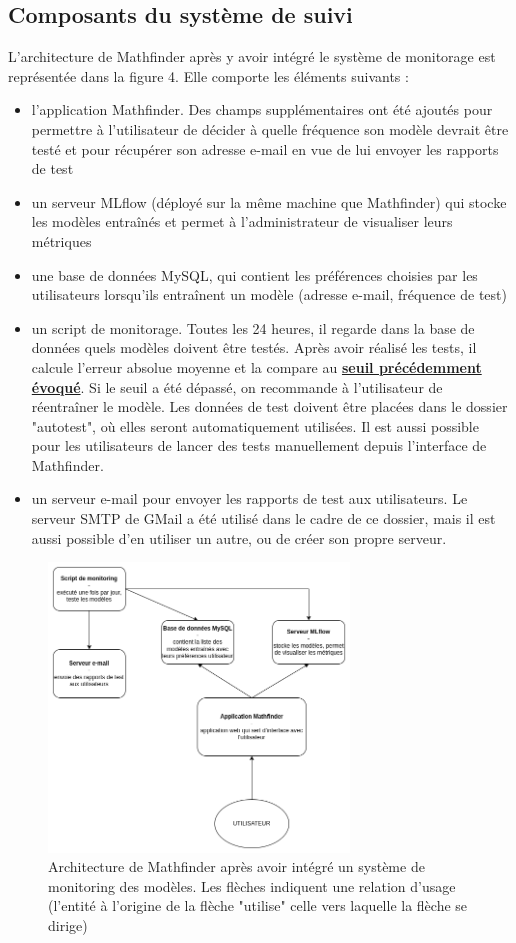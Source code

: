 \documentclass[french]{article}
\begin{document}
    \subsection{Composants du système de suivi}
    L'architecture de Mathfinder après y avoir intégré le système de monitorage est représentée dans la figure 4. Elle comporte les éléments suivants :
    \begin{itemize}
        \item l'application Mathfinder. Des champs supplémentaires ont été ajoutés pour permettre à l'utilisateur de décider à quelle fréquence son modèle devrait être testé et pour récupérer son adresse e-mail en vue de lui envoyer les rapports de test
        \item un serveur MLflow (déployé sur la même machine que Mathfinder) qui stocke les modèles entraînés et permet à l'administrateur de visualiser leurs métriques
        \item une base de données MySQL, qui contient les préférences choisies par les utilisateurs lorsqu'ils entraînent un modèle (adresse e-mail, fréquence de test)
        \item un script de monitorage. Toutes les 24 heures, il regarde dans la base de données quels modèles doivent être testés. Après avoir réalisé les tests, il calcule l'erreur absolue moyenne et la compare au \textbf{\hyperref[sec:metrics]{seuil précédemment évoqué}}. Si le seuil a été dépassé, on recommande à l'utilisateur de réentraîner le modèle. Les données de test doivent être placées dans le dossier "autotest", où elles seront automatiquement utilisées. Il est aussi possible pour les utilisateurs de lancer des tests manuellement depuis l'interface de Mathfinder.
        \item un serveur e-mail pour envoyer les rapports de test aux utilisateurs. Le serveur SMTP de GMail a été utilisé dans le cadre de ce dossier, mais il est aussi possible d'en utiliser un autre, ou de créer son propre serveur.
    \end{itemize}
    \begin{figure}[h!]
        \includegraphics[width=8cm]{monitoring_E5}
        \centering
        \caption{Architecture de Mathfinder après avoir intégré un système de monitoring des modèles. Les flèches indiquent une relation d'usage (l'entité à l'origine de la flèche "utilise" celle vers laquelle la flèche se dirige)}
        \centering
    \end{figure}
\end{document}
